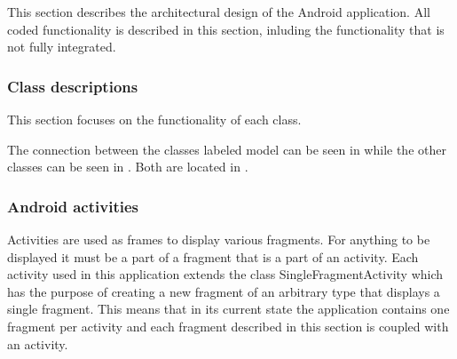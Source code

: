This section describes the architectural design of the Android application. All coded functionality is described in this section, inluding the functionality that is not fully integrated. 
\subsubsection{Class descriptions}\label{sec:and_classdescription}
This section focuses on the functionality of each class.

The connection between the classes labeled model can be seen in
 while the other classes can be seen in
. Both are located in .

\subsubsection{Android activities} 
Activities are used as frames to display various fragments. For anything to be
displayed it must be a part of a fragment that is a part of an activity. Each
activity used in this application extends the class SingleFragmentActivity which
has the purpose of creating a new fragment of an arbitrary type that displays a
single fragment. This means that in its current state the application contains
one fragment per activity and each fragment described in this section is coupled
with an activity.

